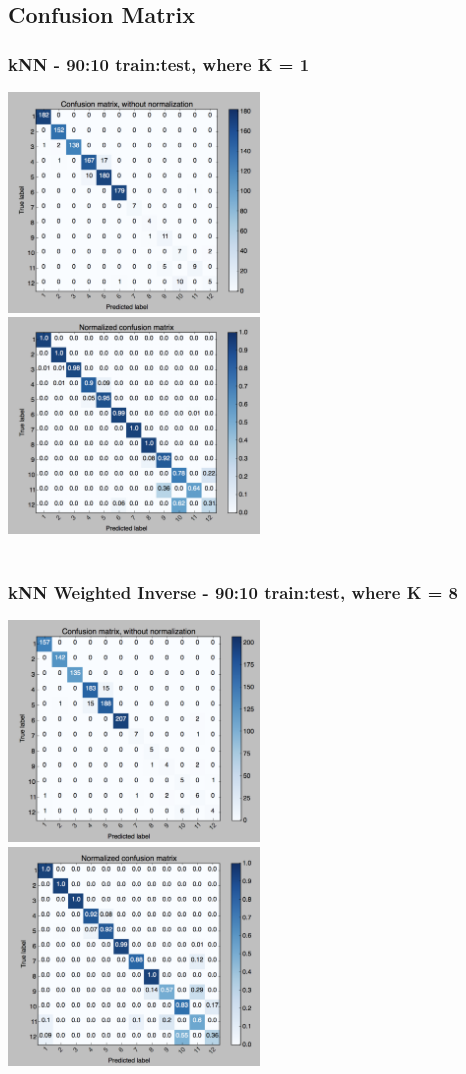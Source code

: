 \documentclass[paper=a4, fontsize=11pt]{scrartcl}
\numberwithin{equation}{section}		%
\numberwithin{figure}{section}			%
\numberwithin{table}{section}				%
\begin{document}
\subsection{Confusion Matrix}

\subsubsection{kNN - 90:10 train:test, where K = 1}
\includegraphics[width=0.5\textwidth]{first.png}
\includegraphics[width=0.5\textwidth]{firstN.png}
\\
\\
\subsubsection{kNN Weighted Inverse - 90:10 train:test, where K = 8}
\includegraphics[width=0.5\textwidth]{second.png}
\includegraphics[width=0.5\textwidth]{secondN.png}
\\
\\
\end{document}
